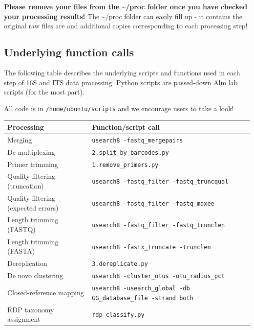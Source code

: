 \documentclass[11pt, oneside]{article}   	%
\begin{document}
\textbf{Please remove your files from the \~{}/proc folder once you have checked your processing results!} The \~{}/proc folder can easily fill up - it contains the original raw files are and additional copies corresponding to each processing step!

\subsection{Underlying function calls}

The following table describes the underlying scripts and functions
used in each step of 16S and ITS data processing. Python scripts
are passed-down Alm lab scripts (for the most part).

All code is in \texttt{/home/ubuntu/scripts} and we encourage users
to take a look!

{
\renewcommand{\arraystretch}{1.2}
\begin{center}
\begin{longtable}{| p{5.5cm} | p{10cm} |}
    \hline
      \textbf{Processing} & \textbf{Function/script call} \\
      \hline
      Merging & \texttt{usearch8 -fastq\_mergepairs} \\
      \hline
      De-multiplexing & \texttt{2.split\_by\_barcodes.py} \\
      \hline
      Primer trimming & \texttt{1.remove\_primers.py} \\
      \hline
      Quality filtering (truncation) & \texttt{usearch8 -fastq\_filter -fastq\_truncqual} \\
      \hline
      Quality filtering (expected errors) & \texttt{usearch8 -fastq\_filter -fastq\_maxee} \\
      \hline
      Length trimming (FASTQ) & \texttt{usearch8 -fastq\_filter -fastq\_trunclen} \\
      \hline
      Length trimming (FASTA) & \texttt{usearch8 -fastx\_truncate -trunclen} \\
      \hline
      Dereplication & \texttt{3.dereplicate.py} \\      
      \hline
      De novo clustering & \texttt{usearch8 -cluster\_otus -otu\_radius\_pct} \\
      \hline
      Closed-reference mapping & \texttt{usearch8 -usearch\_global -db GG\_database\_file -strand both} \\
      \hline
      RDP taxonomy assignment & \texttt{rdp\_classify.py} \\
      \hline
\end{longtable}
\end{center}
}
\end{document}
